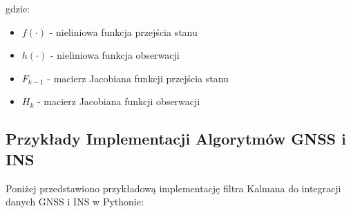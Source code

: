 gdzie:
\begin{itemize}
    \item \( f(\cdot) \) - nieliniowa funkcja przejścia stanu
    \item \( h(\cdot) \) - nieliniowa funkcja obserwacji
    \item \( F_{k-1} \) - macierz Jacobiana funkcji przejścia stanu
    \item \( H_k \) - macierz Jacobiana funkcji obserwacji
\end{itemize}

\subsection{Przykłady Implementacji Algorytmów GNSS i INS}
Poniżej przedstawiono przykładową implementację filtra Kalmana do integracji danych GNSS i INS w Pythonie:


